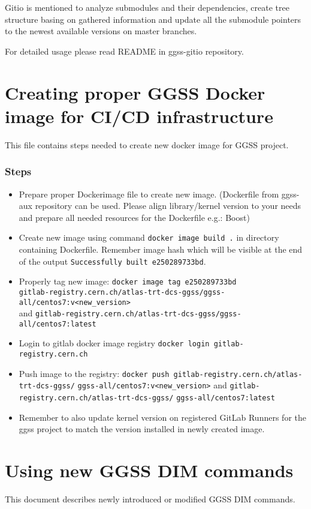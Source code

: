 Gitio is mentioned to analyze submodules and their dependencies, create tree structure basing on gathered information and update all the submodule pointers to the newest available versions on master branches.

For detailed usage please read README in ggss-gitio repository.

\clearpage
\section{Creating proper GGSS Docker image for CI/CD infrastructure}
This file contains steps needed to create new docker image for GGSS project.

\subsubsection*{Steps}
\begin{itemize}
    \item Prepare proper Dockerimage file to create new image. (Dockerfile from ggss-aux repository can be used. Please align library/kernel version to your needs and prepare all needed resources for the Dockerfile e.g.: Boost)
    \item Create new image using command \lstinline{docker image build .} in directory containing Dockerfile. Remember image hash which will be visible at the end of the output \lstinline{Successfully built e250289733bd}.
    \item Properly tag new image:
    \lstinline{docker image tag e250289733bd} \\
    \lstinline{gitlab-registry.cern.ch/atlas-trt-dcs-ggss/ggss-all/centos7:v<new_version>} \\
    and \lstinline{gitlab-registry.cern.ch/atlas-trt-dcs-ggss/ggss-all/centos7:latest}
    \item Login to gitlab docker image registry \lstinline{docker login gitlab-registry.cern.ch}
    \item Push image to the registry: \lstinline{docker push gitlab-registry.cern.ch/atlas-trt-dcs-ggss/} \lstinline{ggss-all/centos7:v<new_version>} and \lstinline{gitlab-registry.cern.ch/atlas-trt-dcs-ggss/} \lstinline{ggss-all/centos7:latest}
    \item Remember to also update kernel version on registered GitLab Runners for the ggss project to match the version installed in newly created image.
\end{itemize}

\clearpage
\section{Using new GGSS DIM commands}
This document describes newly introduced or modified GGSS DIM commands.

